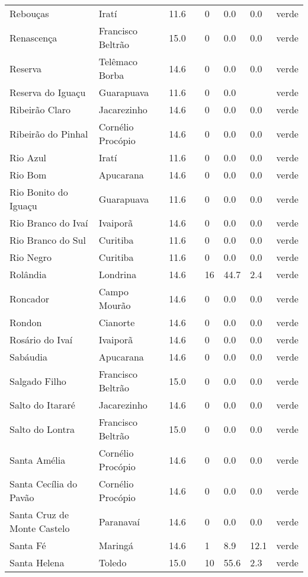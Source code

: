 \begin{longtable}{l|lllllll}
  Rebouças & Iratí & 11.6 &  & 0 & 0.0 & 0.0 & verde \\ 
  Renascença & Francisco Beltrão & 15.0 &  & 0 & 0.0 & 0.0 & verde \\ 
  Reserva & Telêmaco Borba & 14.6 &  & 0 & 0.0 & 0.0 & verde \\ 
  Reserva do Iguaçu & Guarapuava & 11.6 &  & 0 & 0.0 &  & verde \\ 
  Ribeirão Claro & Jacarezinho & 14.6 &  & 0 & 0.0 & 0.0 & verde \\ 
  Ribeirão do Pinhal & Cornélio Procópio & 14.6 &  & 0 & 0.0 & 0.0 & verde \\ 
  Rio Azul & Iratí & 11.6 &  & 0 & 0.0 & 0.0 & verde \\ 
  Rio Bom & Apucarana & 14.6 &  & 0 & 0.0 & 0.0 & verde \\ 
  Rio Bonito do Iguaçu & Guarapuava & 11.6 &  & 0 & 0.0 & 0.0 & verde \\ 
  Rio Branco do Ivaí & Ivaiporã & 14.6 &  & 0 & 0.0 & 0.0 & verde \\ 
  Rio Branco do Sul & Curitiba & 11.6 &  & 0 & 0.0 & 0.0 & verde \\ 
  Rio Negro & Curitiba & 11.6 &  & 0 & 0.0 & 0.0 & verde \\ 
  Rolândia & Londrina & 14.6 &  & 16 & 44.7 & 2.4 & verde \\ 
  Roncador & Campo Mourão & 14.6 &  & 0 & 0.0 & 0.0 & verde \\ 
  Rondon & Cianorte & 14.6 &  & 0 & 0.0 & 0.0 & verde \\ 
  Rosário do Ivaí & Ivaiporã & 14.6 &  & 0 & 0.0 & 0.0 & verde \\ 
  Sabáudia & Apucarana & 14.6 &  & 0 & 0.0 & 0.0 & verde \\ 
  Salgado Filho & Francisco Beltrão & 15.0 &  & 0 & 0.0 & 0.0 & verde \\ 
  Salto do Itararé & Jacarezinho & 14.6 &  & 0 & 0.0 & 0.0 & verde \\ 
  Salto do Lontra & Francisco Beltrão & 15.0 &  & 0 & 0.0 & 0.0 & verde \\ 
  Santa Amélia & Cornélio Procópio & 14.6 &  & 0 & 0.0 & 0.0 & verde \\ 
  Santa Cecília do Pavão & Cornélio Procópio & 14.6 &  & 0 & 0.0 & 0.0 & verde \\ 
  Santa Cruz de Monte Castelo & Paranavaí & 14.6 &  & 0 & 0.0 & 0.0 & verde \\ 
  Santa Fé & Maringá & 14.6 &  & 1 & 8.9 & 12.1 & verde \\ 
  Santa Helena & Toledo & 15.0 &  & 10 & 55.6 & 2.3 & verde \\ 

\end{longtable}
